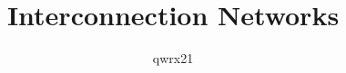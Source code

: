 \documentclass{article}
\author{qwrx21}
\title{Interconnection Networks}
\begin{document}
\maketitle

\pagebreak












%
\end{document}
